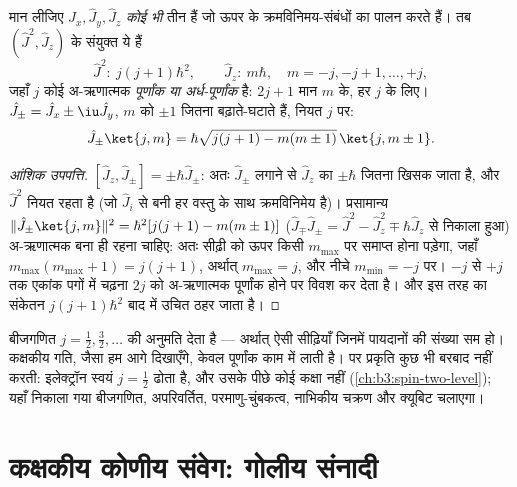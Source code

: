 \begin{theorem}[वर्णक्रम, केवल बीजगणित से]\label{thm:b3:quantum-angular-momentum:spectrum}
मान लीजिए $\hat J_x, \hat J_y, \hat J_z$ \emph{कोई भी} तीन  हैं जो ऊपर के क्रमविनिमय-संबंधों का पालन करते हैं। तब
$(\hat J^2, \hat J_z)$ के संयुक्त  ये हैं
\[
\hat J^2:\ j(j+1)\hbar^2 , \qquad
\hat J_z:\ m\hbar , \quad m = -j, -j+1, \dots, +j ,
\]
जहाँ $j$ कोई अ-ऋणात्मक \emph{पूर्णांक या अर्ध-पूर्णांक} है: $2j + 1$
मान $m$ के, हर $j$ के लिए।  $\hat J_\pm = \hat
J_x \pm \iu\hat J_y$, $m$ को $\pm1$ जितना बढ़ाते-घटाते हैं, नियत $j$ पर:
\[
\hat J_\pm\ket{j,m} = \hbar\sqrt{j(j+1) - m(m\pm1)}\,\ket{j,m\pm1} .
\]
\end{theorem}

\begin{proof}[आंशिक उपपत्ति]
$[\hat J_z, \hat J_\pm] = \pm\hbar\hat J_\pm$: अतः $\hat
J_\pm$ लगाने से $\hat J_z$ का  $\pm\hbar$ जितना खिसक
जाता है, और $\hat J^2$ नियत रहता है (जो $\hat
J_i$ से बनी हर वस्तु के साथ क्रमविनिमेय है)। प्रसामान्य
$\|\hat J_\pm\ket{j,m}\|^2 = \hbar^2[j(j+1) -
m(m\pm1)]$ ($\hat J_\mp\hat J_\pm = \hat J^2 - \hat
J_z^2 \mp \hbar\hat J_z$ से निकाला हुआ) अ-ऋणात्मक बना ही रहना चाहिए:
अतः सीढ़ी को ऊपर किसी $m_{\max}$ पर समाप्त होना पड़ेगा, जहाँ $m_{\max}(m_{\max}+1) =
j(j+1)$, अर्थात् $m_{\max} = j$, और नीचे $m_{\min} = -j$ पर।
$-j$ से $+j$ तक एकांक पगों में चढ़ना $2j$ को
अ-ऋणात्मक पूर्णांक होने पर विवश कर देता है। और इस तरह  का
संकेतन $j(j+1)\hbar^2$ बाद में उचित ठहर जाता है।
\end{proof}

\begin{remark}[सूची में एक रिक्ति]\label{rem:b3:quantum-angular-momentum:halfinteger}
बीजगणित $j = \tfrac12, \tfrac32, \dots$ की अनुमति देता है --- अर्थात्
ऐसी सीढ़ियाँ जिनमें पायदानों की संख्या सम हो। कक्षकीय गति, जैसा हम आगे
दिखाएँगे, केवल पूर्णांक काम में लाती है। पर प्रकृति कुछ भी बरबाद नहीं
करती: इलेक्ट्रॉन स्वयं $j = \tfrac12$ ढोता है, और उसके पीछे कोई कक्षा
नहीं (\cref{ch:b3:spin-two-level}); यहाँ निकाला गया बीजगणित,
अपरिवर्तित, परमाणु-चुंबकत्व, नाभिकीय चक्रण और क्यूबिट चलाएगा।
\end{remark}

\section{कक्षकीय कोणीय संवेग: गोलीय संनादी}


